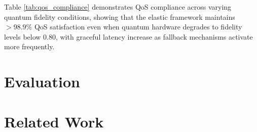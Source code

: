\documentclass[lettersize,journal]{IEEEtran}
\begin{document}


\begin{table}
\centering
\caption{QoS Compliance Under Quantum Fidelity Degradation}
\label{tab:qos_compliance}
\end{table}

Table \ref{tab:qos_compliance} demonstrates QoS compliance across varying quantum fidelity conditions, showing that the elastic framework maintains $> 98.9\%$ QoS satisfaction even when quantum hardware degrades to fidelity levels below 0.80, with graceful latency increase as fallback mechanisms activate more frequently.
\section{Evaluation}
\label{sec:evaluation}






\section{Related Work}
\label{sec:related_work}
\end{document}
